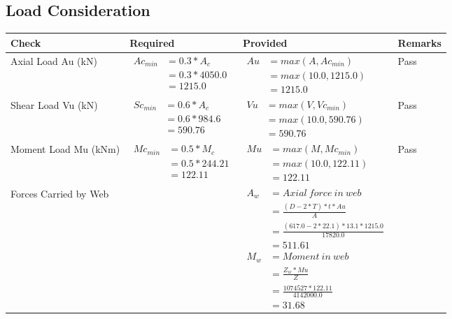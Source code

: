 \documentclass{article}%
\begin{document}
%
\newpage%
\subsection{Load Consideration}%
\label{subsec:LoadConsideration}%
\renewcommand{\arraystretch}{1.2}%
\begin{longtable}{|p{4cm}|p{5cm}|p{5.5cm}|p{1.5cm}|}%
\hline%
\rowcolor{OsdagGreen}%
Check&Required&Provided&Remarks\\%
\hline%
\endhead%
\hline%
Axial Load Au (kN)&$\begin{aligned} Ac_{min} &= 0.3 * A_c\\ &= 0.3 *4050.0\\ &=1215.0\end{aligned}$&$\begin{aligned} Au &= max(A,Ac_{min} )\\ &= max( 10.0,1215.0)\\ &=1215.0\end{aligned}$&Pass\\%
\hline%
Shear Load Vu (kN)&$\begin{aligned} Sc_{min} &= 0.6 * A_c\\ &= 0.6 *984.6\\ &=590.76\end{aligned}$&$\begin{aligned} Vu &= max(V,Vc_{min})\\ &=  max(10.0,590.76)\\ &=590.76\end{aligned}$&Pass\\%
\hline%
Moment Load Mu (kNm)&$\begin{aligned} Mc_{min} &= 0.5 * M_c\\ &= 0.5 *244.21\\ &=122.11\end{aligned}$&$\begin{aligned} Mu &= max(M,Mc_{min} )\\ &= max(10.0,122.11)\\ &=122.11\end{aligned}$&Pass\\%
\hline%
Forces Carried by Web&&$\begin{aligned}A_w &= Axial~ force~ in~ web  \\   &= \frac{(D- 2*T)*t* Au }{A} \\ &= \frac{(617.0- 2*22.1)*13.1*1215.0 }{17820.0} \\ &=511.61\\ M_w &= Moment ~in ~web  \\  &= \frac{Z_w * Mu}{Z} \\ &= \frac{1074527 * 122.11}{4142000.0} \\ &=31.68\end{aligned}$&\\%

\end{longtable}
\end{document}
